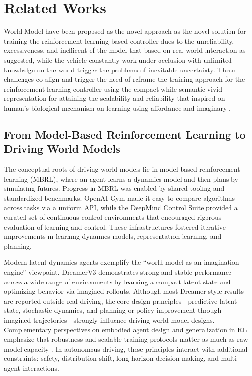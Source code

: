\section{Related Works}
\label{sec:related_work}

World Model have been proposed as the novel-approach as the novel solution for training the reinforcement learning based controller dues to the unreliability, excessiveness, and inefficent of the model that based on real-world interaction as \cite{dulacarnold_2019_challenges} suggested, while the vehicle constantly work under occlusion with unlimited knowledge on the world trigger the problems of inevitable uncertainty. These challenges co-align and trigger the need of reframe the training approach for the reinforcement-learning controller using the compact while semantic vivid representation for attaining the scalability and reliability  that inspired on human's biological mechanism on learning using affordance and imaginary \cite{LeCun2022, gibson_1979_the}.

\subsection{From Model-Based Reinforcement Learning to Driving World Models}

The conceptual roots of driving world models lie in model-based reinforcement learning (MBRL), where an agent learns a dynamics model and then plans by simulating futures. Progress in MBRL was enabled by shared tooling and standardized benchmarks. OpenAI Gym \cite{Brockman2016} made it easy to compare algorithms across tasks via a uniform API, while the DeepMind Control Suite \cite{Tassa2018} provided a curated set of continuous-control environments that encouraged rigorous evaluation of learning and control. These infrastructures fostered iterative improvements in learning dynamics models, representation learning, and planning.

Modern latent-dynamics agents exemplify the “world model as an imagination engine” viewpoint. DreamerV3 \cite{Hafner2023} demonstrates strong and stable performance across a wide range of environments by learning a compact latent state and optimizing behavior via imagined rollouts. Although most Dreamer-style results are reported outside real driving, the core design principles—predictive latent state, stochastic dynamics, and planning or policy improvement through imagined trajectories—strongly influence driving world model designs. Complementary perspectives on embodied agent design and generalization in RL emphasize that robustness and scalable training protocols matter as much as raw model capacity \cite{Hansen2023}. In autonomous driving, these principles interact with additional constraints: safety, distribution shift, long-horizon decision-making, and multi-agent interactions.

